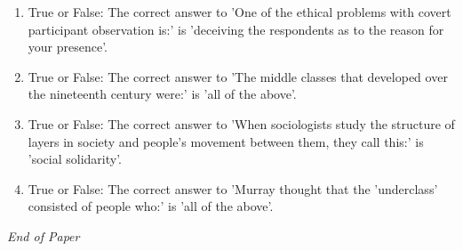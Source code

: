 \documentclass[12pt]{article}
\begin{document}
\begin{enumerate}[label=\arabic*.]
\item True or False: The correct answer to 'One of the ethical problems with covert participant observation is:' is 'deceiving the respondents as to the reason for your presence'.
\item True or False: The correct answer to 'The middle classes that developed over the nineteenth century were:' is 'all of the above'.
\item True or False: The correct answer to 'When sociologists study the structure of layers in society and people's movement between them, they call this:' is 'social solidarity'.
\item True or False: The correct answer to 'Murray thought that the 'underclass' consisted of people who:' is 'all of the above'.
\end{enumerate}

\vfill
\noindent\textit{End of Paper}
\end{document}
